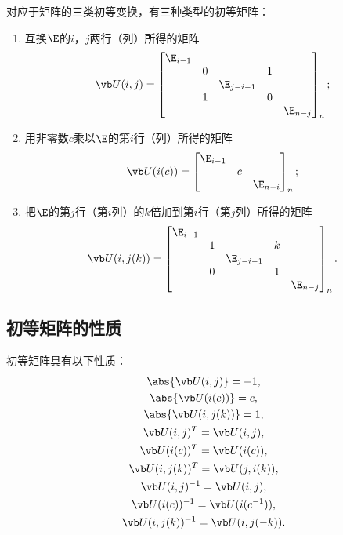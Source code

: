 对应于矩阵的三类初等变换，有三种类型的初等矩阵：
\begin{enumerate}
	\item 互换\(\E\)的\(i\)，\(j\)两行（列）所得的矩阵\[
		\P(i,j) = \begin{bmatrix}
			\E_{i-1} & & & \\
			& 0 & & 1 & \\
			& & \E_{j-i-1} & & \\
			& 1 & & 0 & \\
			& & & & \E_{n-j}
		\end{bmatrix}_n;
	\]
	\item 用非零数\(c\)乘以\(\E\)的第\(i\)行（列）所得的矩阵\[
		\P(i(c)) = \begin{bmatrix}
			\E_{i-1} & & \\
			& c & \\
			& & \E_{n-i}
		\end{bmatrix}_n;
	\]
	\item 把\(\E\)的第\(j\)行（第\(i\)列）的\(k\)倍加到第\(i\)行（第\(j\)列）所得的矩阵\[
		\P(i,j(k)) = \begin{bmatrix}
			\E_{i-1} & & & \\
			& 1 & & k & \\
			& & \E_{j-i-1} & & \\
			& 0 & & 1 & \\
			& & & & \E_{n-j}
		\end{bmatrix}_n.
	\]
\end{enumerate}

\subsection{初等矩阵的性质}
\begin{property}\label{theorem:逆矩阵.初等矩阵的性质1}
初等矩阵具有以下性质：\begin{gather}
	\abs{\P(i,j)} = -1, \\
	\abs{\P(i(c))} = c, \\
	\abs{\P(i,j(k))} = 1, \\
	\P(i,j)^T = \P(i,j), \\
	\P(i(c))^T = \P(i(c)), \\
	\P(i,j(k))^T = \P(j,i(k)), \\
	\P(i,j)^{-1} = \P(i,j), \\
	\P(i(c))^{-1} = \P(i(c^{-1})), \\
	\P(i,j(k))^{-1} = \P(i,j(-k)).
\end{gather}
\end{property}

